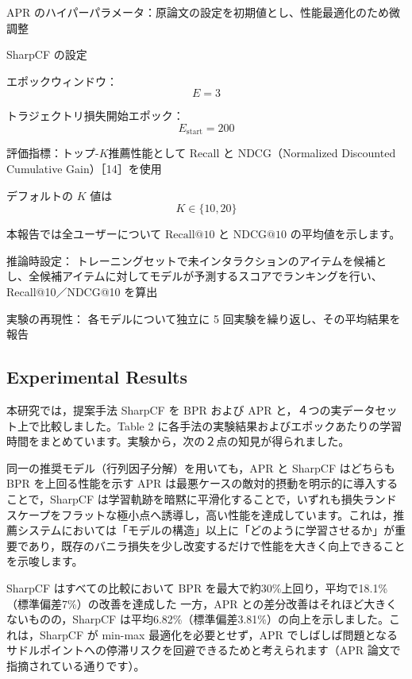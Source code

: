 \documentclass[11pt,a4paper]{article}
\begin{document}
APR のハイパーパラメータ：原論文の設定を初期値とし、性能最適化のため微調整

SharpCF の設定

エポックウィンドウ：
\begin{equation}
E = 3
\end{equation}

トラジェクトリ損失開始エポック：
\begin{equation}
E_{\text{start}} = 200
\end{equation}

評価指標：トップ-$K$推薦性能として Recall と NDCG（Normalized Discounted Cumulative Gain）［14］を使用

デフォルトの $K$ 値は
\begin{equation}
K \in \{10, 20\}
\end{equation}

本報告では全ユーザーについて $\mathrm{Recall}@10$ と $\mathrm{NDCG}@10$ の平均値を示します。

推論時設定：
トレーニングセットで未インタラクションのアイテムを候補とし、全候補アイテムに対してモデルが予測するスコアでランキングを行い、Recall@10／NDCG@10 を算出

実験の再現性：
各モデルについて独立に 5 回実験を繰り返し、その平均結果を報告

\subsection{Experimental Results}

本研究では，提案手法 SharpCF を BPR および APR と，４つの実データセット上で比較しました。Table 2 に各手法の実験結果およびエポックあたりの学習時間をまとめています。実験から，次の２点の知見が得られました。

同一の推奨モデル（行列因子分解）を用いても，APR と SharpCF はどちらも BPR を上回る性能を示す
APR は最悪ケースの敵対的摂動を明示的に導入することで，SharpCF は学習軌跡を暗黙に平滑化することで，いずれも損失ランドスケープをフラットな極小点へ誘導し，高い性能を達成しています。これは，推薦システムにおいては「モデルの構造」以上に「どのように学習させるか」が重要であり，既存のバニラ損失を少し改変するだけで性能を大きく向上できることを示唆します。

SharpCF はすべての比較において BPR を最大で約30\%上回り，平均で18.1\%（標準偏差7\%）の改善を達成した
一方，APR との差分改善はそれほど大きくないものの，SharpCF は平均6.82\%（標準偏差3.81\%）の向上を示しました。これは，SharpCF が min-max 最適化を必要とせず，APR でしばしば問題となるサドルポイントへの停滞リスクを回避できるためと考えられます（APR 論文で指摘されている通りです）。
\end{document}
